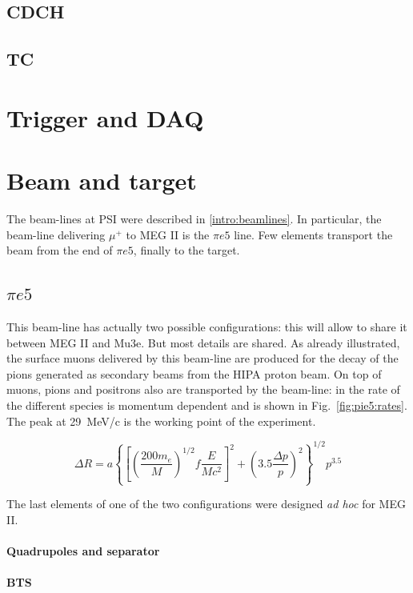 \begin{refsection}
\subsection{CDCH}
\subsection{TC}
\section{Trigger and DAQ}
\section{Beam and target}
The beam-lines at PSI were described in \ref{intro:beamlines}. 
In particular, the beam-line delivering $\mu^+$ to MEG II is the $\pi e5$ line. 
Few elements transport the beam from the end of $\pi e5$, finally to the target.

\subsection{$\pi e5$}
This beam-line has actually two possible configurations: this will allow to share it between MEG II and Mu3e. But most details are shared.
As already illustrated, the surface muons delivered by this beam-line are produced for the decay of the pions generated as secondary beams from the HIPA proton beam.
On top of muons, pions and positrons also are transported by the beam-line: in  the rate of the different species is momentum dependent and is shown in Fig.~\ref{fig:pie5:rates}.
The peak at \SI{29}{MeV/c} is the working point of the experiment.

\begin{equation}
    \Delta R = a \left\{
        \left[  
            \left( \frac{200 m_e}{M}\right)^{1/2} f \frac{E}{Mc^2}
        \right]^2 + 
        \left( 3.5\frac{\Delta p }{p}\right)^2
    \right\} ^{1/2} p^{3.5}
\end{equation}

\noindent The last elements of one of the two configurations were designed \textit{ad hoc} for MEG II.
\paragraph{Quadrupoles and separator}
\paragraph{BTS}

\end{refsection}
